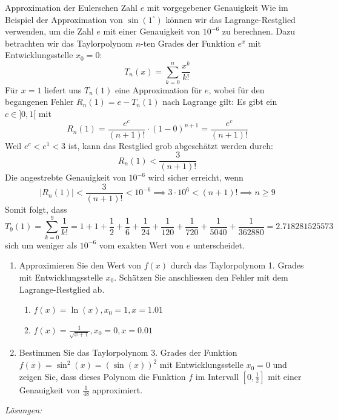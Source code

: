 \begin{bsp}
    {Approximation der Eulerschen Zahl $e$ mit vorgegebener Genauigkeit}{}
    Wie im Beispiel der Approximation von \(\sin(1^\circ)\) können wir das Lagrange-Restglied verwenden, um die Zahl \(e\) mit einer Genauigkeit von \(10^{-6}\) zu berechnen. Dazu betrachten wir das Taylorpolynom \(n\)-ten Grades der Funktion \(e^x\) mit Entwicklungsstelle \(x_0 = 0\):
\[ T_n(x) = \sum_{k=0}^n \frac{x^k}{k!} \]
Für \(x = 1\) liefert uns \(T_n(1)\) eine Approximation für \(e\), wobei für den begangenen Fehler \(R_n(1) = e - T_n(1)\) nach Lagrange gilt: Es gibt ein \(c \in ]0, 1[\) mit
\[ R_n(1) = \frac{e^c}{(n+1)!} \cdot (1 - 0)^{n+1} = \frac{e^c}{(n+1)!} \]
Weil \(e^c < e^1 < 3\) ist, kann das Restglied grob abgeschätzt werden durch:
\[ R_n(1) < \frac{3}{(n+1)!} \]
Die angestrebte Genauigkeit von \(10^{-6}\) wird sicher erreicht, wenn
\[ |R_n(1)| < \frac{3}{(n+1)!} < 10^{-6} \implies 3 \cdot 10^6 < (n+1)! \implies n \geq 9 \]
Somit folgt, dass
\[ T_9(1) = \sum_{k=0}^9 \frac{1}{k!} = 1 + 1 + \frac{1}{2} + \frac{1}{6} + \frac{1}{24} + \frac{1}{120} + \frac{1}{720} + \frac{1}{5040} + \frac{1}{362880} =2.718281525573\ \]
sich um weniger als \(10^{-6}\) vom exakten Wert von $e$ unterscheidet.

\end{bsp}
\clearpage
\begin{ueb}
    {}{}
    \begin{enumerate}
        \item 	Approximieren Sie den Wert von $f(x)$ durch das Taylorpolynom 1. Grades mit Entwicklungsstelle $x_0$. Schätzen Sie anschliessen den Fehler mit dem Lagrange-Restglied ab.
        \begin{enumerate}
            \item 	$f(x)=\ln(x), x_0=1,   x=1.01$
            \item  	$f(x)=\frac{1}{\sqrt{x+1}}, x_0=0,   x=0.01$
        \end{enumerate}
        \item  	Bestimmen Sie das Taylorpolynom 3. Grades der Funktion $f(x)=\sin^2(x)=(\sin(x) )^2$ mit Entwicklungsstelle $x_0=0$ und zeigen Sie, dass dieses Polynom die Funktion $f$ im Intervall $\left[0,\frac{1}{2}\right]$ mit einer Genauigkeit von $\frac{1}{48}$ approximiert.
       
    \end{enumerate}
\end{ueb}
\clearpage
\emph{Lösungen:}
